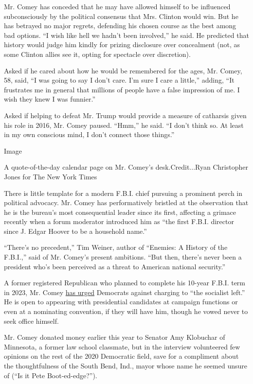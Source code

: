 Mr. Comey has conceded that he may have allowed himself to be influenced
subconsciously by the political consensus that Mrs. Clinton would win.
But he has betrayed no major regrets, defending his chosen course as the
best among bad options. ``I wish like hell we hadn't been involved,'' he
said. He predicted that history would judge him kindly for prizing
disclosure over concealment (not, as some Clinton allies see it, opting
for spectacle over discretion).

Asked if he cared about how he would be remembered for the ages, Mr.
Comey, 58, said, ``I was going to say I don't care. I'm sure I care a
little,'' adding, ``It frustrates me in general that millions of people
have a false impression of me. I wish they knew I was funnier.''

Asked if helping to defeat Mr. Trump would provide a measure of
catharsis given his role in 2016, Mr. Comey paused. ``Hmm,'' he said.
``I don't think so. At least in my own conscious mind, I don't connect
those things.''

Image

A quote-of-the-day calendar page on Mr. Comey's desk.Credit...Ryan
Christopher Jones for The New York Times

There is little template for a modern F.B.I. chief pursuing a prominent
perch in political advocacy. Mr. Comey has performatively bristled at
the observation that he is the bureau's most consequential leader since
its first, affecting a grimace recently when a forum moderator
introduced him as ``the first F.B.I. director since J. Edgar Hoover to
be a household name.''

``There's no precedent,'' Tim Weiner, author of ``Enemies: A History of
the F.B.I.,'' said of Mr. Comey's present ambitions. ``But then, there's
never been a president who's been perceived as a threat to American
national security.''

A former registered Republican who planned to complete his 10-year
F.B.I. term in 2023, Mr. Comey
\href{https://twitter.com/comey/status/1021132108381683712?lang=en}{has
urged} Democrats against charging to ``the socialist left.'' He is open
to appearing with presidential candidates at campaign functions or even
at a nominating convention, if they will have him, though he vowed never
to seek office himself.

Mr. Comey donated money earlier this year to Senator Amy Klobuchar of
Minnesota, a former law school classmate, but in the interview
volunteered few opinions on the rest of the 2020 Democratic field, save
for a compliment about the thoughtfulness of the South Bend, Ind., mayor
whose name he seemed unsure of (``Is it Pete Boot-ed-edge?'').

